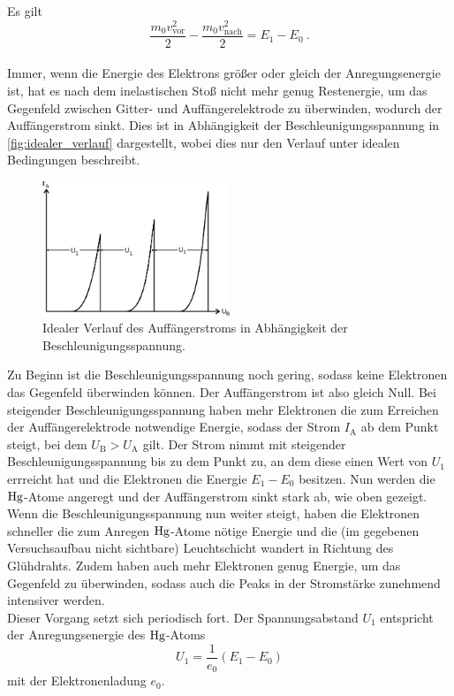     Es gilt
    \begin{equation*}
        \frac{m_0 v^2_\text{vor}}{2} - \frac{m_0 v^2_\text{nach}}{2} = E_1 - E_0 \ .
    \end{equation*}
    \\
    Immer,
    wenn die Energie des Elektrons größer oder gleich der Anregungsenergie ist,
    hat es nach dem inelastischen Stoß nicht mehr genug Restenergie,
    um das Gegenfeld zwischen Gitter- und Auffängerelektrode zu überwinden,
    wodurch der Auffängerstrom sinkt.
    Dies ist in Abhängigkeit der Beschleunigungsspannung in \autoref{fig:idealer_verlauf} dargestellt,
    wobei dies nur den Verlauf unter idealen Bedingungen beschreibt.
    \begin{figure}[H]
        \centering
        \includegraphics[width=0.5\textwidth]{content/img/Abb_2.pdf}
        \caption{Idealer Verlauf des Auffängerstroms in Abhängigkeit der Beschleunigungsspannung. \cite{versuchsanleitung}}
        \label{fig:idealer_verlauf}
    \end{figure}
    Zu Beginn ist die Beschleunigungsspannung noch gering,
    sodass keine Elektronen das Gegenfeld überwinden können.
    Der Auffängerstrom ist also gleich Null.
    Bei steigender Beschleunigungsspannung haben mehr Elektronen
    die zum Erreichen der Auffängerelektrode notwendige Energie,
    sodass der Strom $I_\text{A}$ ab dem Punkt steigt,
    bei dem $U_\text{B} > U_\text{A}$ gilt.
    Der Strom nimmt mit steigender Beschleunigungsspannung bis zu dem Punkt zu,
    an dem diese einen Wert von $U_1$ errreicht hat und die Elektronen die Energie $E_1-E_0$ besitzen.
    Nun werden die $\ce{Hg}$-Atome angeregt und der Auffängerstrom sinkt stark ab,
    wie oben gezeigt.
    Wenn die Beschleunigungsspannung nun weiter steigt,
    haben die Elektronen schneller die zum Anregen $\ce{Hg}$-Atome nötige Energie
    und die (im gegebenen Versuchsaufbau nicht sichtbare) Leuchtschicht wandert in Richtung des Glühdrahts.
    Zudem haben auch mehr Elektronen genug Energie,
    um das Gegenfeld zu überwinden,
    sodass auch die Peaks in der Stromstärke zunehmend intensiver werden.\\
    Dieser Vorgang setzt sich periodisch fort.
    Der Spannungsabstand $U_1$ entspricht der Anregungsenergie des $\ce{Hg}$-Atoms
    \begin{equation*}
        U_1 = \frac{1}{e_0} (E_1 - E_0)
    \end{equation*}
    mit der Elektronenladung $e_0$.


